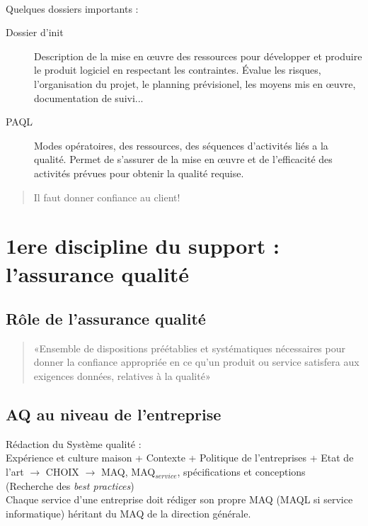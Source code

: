 \hfill\\
Quelques dossiers importants :
\begin{description}
\item[Dossier d’init] Description de la mise en \oe{}uvre des ressources pour développer et produire le produit logiciel en respectant les contraintes. 
Évalue les risques, l’organisation du projet, le planning prévisionel, les moyens mis en \oe{}uvre, documentation de suivi...

\item[PAQL] Modes opératoires, des ressources, des séquences d’activités liés a la qualité. Permet de s’assurer de la mise en \oe{}uvre et de l’efficacité des activités prévues pour obtenir la qualité requise.
\end{description}

\begin{quote}
\textsc Il faut donner confiance au client! 
\end{quote}

\section{1ere discipline du support : l'assurance qualité}

	\subsection{Rôle de l’assurance qualité}

\begin{quote}
«Ensemble de dispositions préétablies et systématiques nécessaires pour donner la confiance appropriée en ce qu’un produit ou service satisfera aux exigences données, relatives à la qualité»
\end{quote}


	\subsection{AQ au niveau de l’entreprise}

Rédaction du Système qualité :\\
	Expérience et culture maison + Contexte + Politique de l’entreprises + Etat de l’art
		$\rightarrow$ CHOIX $\rightarrow$ MAQ, MAQ$_{service}$, spécifications et conceptions\\
			(Recherche des \textsl{best practices})\\

Chaque service d’une entreprise doit rédiger son propre MAQ (MAQL si service informatique) héritant du MAQ de la direction générale.\\

